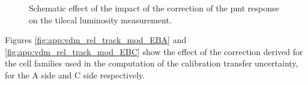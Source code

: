 \begin{figure}[htbp]
\centering
{}
\caption{Schematic effect of the impact of the correction of the \gls{pmt} response on the \gls{tilecal} luminosity measurement.}
\label{fig:apppmt:sketch}
\end{figure}


Figures \ref{fig:app:vdm_rel_track_mod_EBA} and \ref{fig:app:vdm_rel_track_mod_EBC} 
show the effect of the correction derived for the cell families used in the computation of the 
calibration transfer uncertainty, for the A side and C side respectively. 



